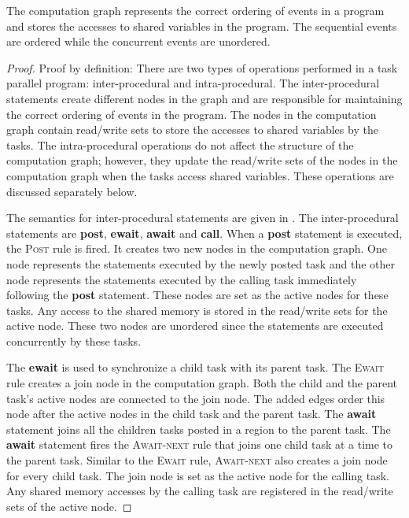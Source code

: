 \begin{theorem} \label{thm:cg}
The computation graph represents the correct ordering of events in a program and stores the accesses to shared variables in the program. The sequential events are ordered while the concurrent events are unordered.
\end{theorem}

\begin{proof}
Proof by definition: There are two types of operations performed in a task parallel program: inter-procedural and intra-procedural. The inter-procedural statements create different nodes in the graph and are responsible for maintaining the correct ordering of events in the program. The nodes in the computation graph contain read/write sets to store the accesses to shared variables by the tasks. The intra-procedural operations do not affect the structure of the computation graph; however, they update the read/write sets of the nodes in the computation graph when the tasks access shared variables. These operations are discussed separately below.
 
The semantics for inter-procedural statements are given in .
The inter-procedural statements are \textbf{post}, \textbf{ewait}, \textbf{await} and \textbf{call}. When a \textbf{post} statement is executed, the \textsc{Post} rule is fired. It creates two new nodes in the computation graph. One node represents the statements executed by the newly posted task and the other node represents the statements executed by the calling task immediately following the \textbf{post} statement. These nodes are set as the active nodes for these tasks. Any access to the shared memory is stored in the read/write sets for the active node. These two nodes are unordered since the statements are executed concurrently by these tasks.

 The \textbf{ewait} is used to synchronize a child task with its parent task. The \textsc{Ewait} rule creates a join node in the computation graph. Both the child and the parent task's active nodes are connected to the join node. The added edges order this node after the active nodes in the child task and the parent task. The \textbf{await} statement joins all the children tasks posted in a region to the parent task. The \textbf{await} statement fires the \textsc{Await-next} rule that joins one child task at a time to the parent task. Similar to the \textsc{Ewait} rule, \textsc{Await-next} also creates a join node for every child task. The join node is set as the active node for the calling task. Any shared memory accesses by the calling task are registered in the read/write sets of the active node.
 

\end{proof}

